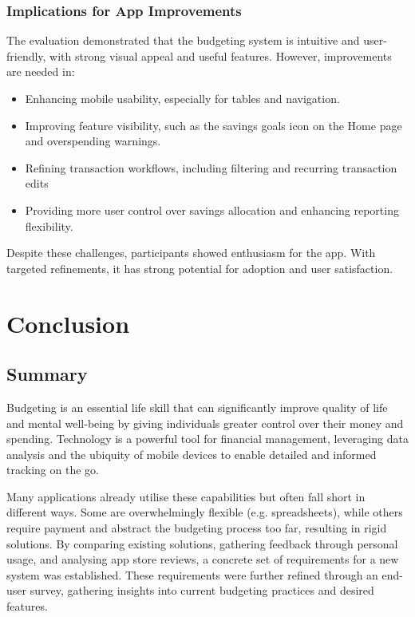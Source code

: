 \documentclass{l4proj}
\begin{document}
\subsection{Implications for App Improvements}  
The evaluation demonstrated that the budgeting system is intuitive and user-friendly, with strong visual appeal and useful features. However, improvements are needed in:
\begin{itemize} \item Enhancing mobile usability, especially for tables and navigation.
\item Improving feature visibility, such as the savings goals icon on the Home page and overspending warnings.
\item Refining transaction workflows, including filtering and recurring transaction edits
\item Providing more user control over savings allocation and enhancing reporting flexibility.
\end{itemize}

Despite these challenges, participants showed enthusiasm for the app. With
targeted refinements, it has strong potential for adoption and user satisfaction.

\chapter{Conclusion}

\section{Summary}
Budgeting is an essential life skill that can significantly improve quality of life and mental well-being by giving individuals greater control over their money and spending. Technology is a powerful tool for financial management, leveraging data analysis and the ubiquity of mobile devices to enable detailed and informed tracking on the go.

Many applications already utilise these capabilities but often fall short in different ways. Some are overwhelmingly flexible (e.g. spreadsheets), while others require payment and abstract the budgeting process too far, resulting in rigid solutions. By comparing existing solutions, gathering feedback through personal usage, and analysing app store reviews, a concrete set of requirements for a new system was established. These requirements were further refined through an end-user survey, gathering insights into current budgeting practices and desired features.
\end{document}
